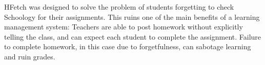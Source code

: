 HFetch was designed to solve the problem of students forgetting to check Schoology for their assignments. This ruins one of the main benefits of a learning management system: Teachers are able to post homework without explicitly telling the class, and can expect each student to complete the assignment. Failure to complete homework, in this case due to forgetfulness, can sabotage learning and ruin grades.